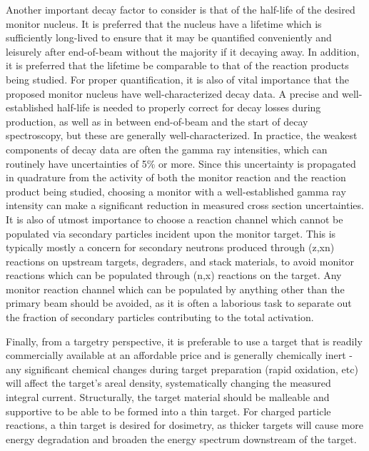 \documentclass[3p]{elsarticle}
\begin{document}
Another important decay factor to consider is that of the half-life of the desired monitor nucleus.
It is preferred that the nucleus have a lifetime which is sufficiently long-lived to ensure that it may be quantified  conveniently and leisurely after end-of-beam without the majority if it decaying away.
In addition, it is preferred that the lifetime be comparable to that of the reaction products being studied. 
For proper quantification, it is also of vital importance that the proposed monitor nucleus have well-characterized decay data.
A precise and well-established half-life is needed to properly correct for decay losses during production, as well as in between end-of-beam and the start of decay spectroscopy, but these are generally well-characterized.
In practice, the weakest components of decay data are often the gamma ray intensities, which can routinely have uncertainties of 5\% or more.
Since this uncertainty is propagated in quadrature from the activity of both the monitor reaction and the reaction product being studied, choosing a monitor with a well-established gamma ray intensity can make a significant reduction in measured cross section uncertainties.
It is also of utmost importance to choose a reaction channel which cannot be populated via secondary particles incident upon the monitor target.
This is typically mostly a concern for secondary neutrons produced through (z,xn) reactions on upstream targets, degraders, and stack materials, to avoid monitor reactions which can be populated through (n,x) reactions on the target.
Any monitor reaction channel which can be populated by anything other than the primary beam should be avoided, as it is often a laborious task to separate out the fraction of secondary particles contributing to the total activation.  



Finally, from a targetry  perspective, it is preferable to use a target that is readily commercially available at an affordable price and is generally chemically inert - any significant chemical changes during target preparation (rapid oxidation, etc) will affect the target's areal density, systematically changing the measured integral current. 
Structurally, the target material should be malleable and supportive to be able to be formed into a thin target.
For charged particle reactions, a thin target is desired for dosimetry, as thicker targets will cause more energy degradation and broaden the energy spectrum downstream of the target.
\end{document}
